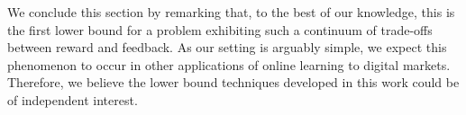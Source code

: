 \documentclass[final,12pt]{colt2025}
\begin{document}
We conclude this section by remarking that, to the best of our knowledge, this is the first lower bound for a problem exhibiting such a continuum of trade-offs between reward and feedback.
As our setting is arguably simple, we expect this phenomenon to occur in other applications of online learning to digital markets. 
Therefore, we believe the lower bound techniques developed in this work could be of independent interest.

%
%
%
%
%
%
%
%
%
%
%
%
%
%
%
%
\end{document}

